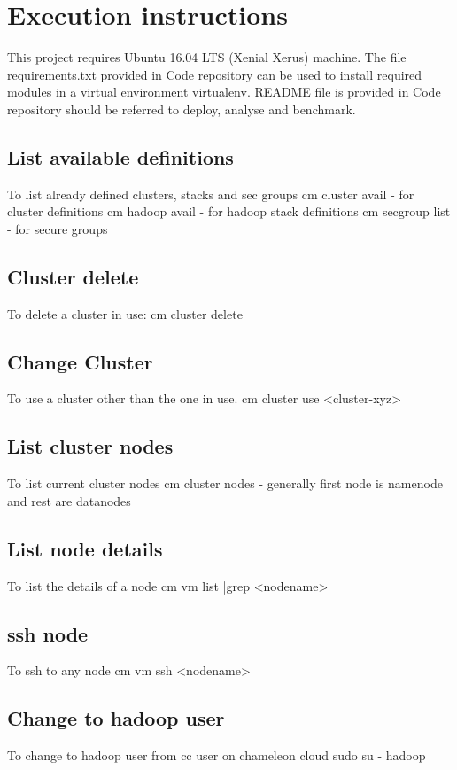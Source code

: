 \documentclass[9pt,twocolumn,twoside]{../../styles/osajnl}
\begin{document}
\section{Execution instructions}
This project requires Ubuntu 16.04 LTS (Xenial Xerus) machine. The file requirements.txt provided in Code repository can be used to install required modules in a virtual environment virtualenv. README file is provided in Code repository should be referred to deploy, analyse and benchmark.
\subsection{List available definitions} To list already defined clusters, stacks and sec groups
\newline cm cluster avail - for cluster definitions
\newline cm hadoop avail - for hadoop stack definitions
\newline cm secgroup list - for secure groups

\subsection{Cluster delete} To delete a cluster in use:
\newline cm cluster delete
\subsection{Change Cluster} To use a cluster other than the one in use.
\newline cm cluster use <cluster-xyz>
\subsection{List cluster nodes} To list current cluster nodes
\newline cm cluster nodes - generally first node is namenode and rest are datanodes
\subsection{List node details} To list the details of a node
\newline cm vm list |grep <nodename>
\subsection{ssh node} To ssh to any node
\newline cm vm ssh <nodename>
\subsection{Change to hadoop user} To change to hadoop user from cc user on chameleon cloud
\newline sudo su - hadoop
\end{document}
